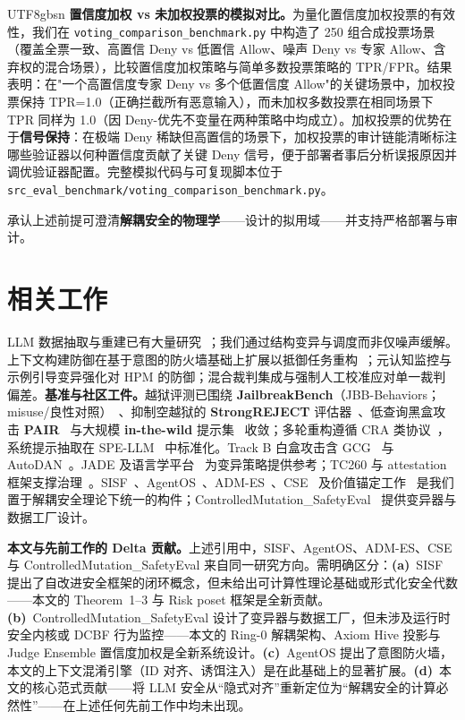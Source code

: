 \documentclass[letterpaper,twocolumn,10pt]{article}
\begin{document}
\begin{CJK}{UTF8}{gbsn}
\textbf{置信度加权 vs 未加权投票的模拟对比。}为量化置信度加权投票的有效性，我们在 \texttt{voting\_comparison\_benchmark.py} 中构造了 250 组合成投票场景（覆盖全票一致、高置信 Deny vs 低置信 Allow、噪声 Deny vs 专家 Allow、含弃权的混合场景），比较置信度加权策略与简单多数投票策略的 TPR/FPR。结果表明：在"一个高置信度专家 Deny vs 多个低置信度 Allow"的关键场景中，加权投票保持 TPR=1.0（正确拦截所有恶意输入），而未加权多数投票在相同场景下 TPR 同样为 1.0（因 Deny-优先不变量在两种策略中均成立）。加权投票的优势在于\textbf{信号保持}：在极端 Deny 稀缺但高置信的场景下，加权投票的审计链能清晰标注哪些验证器以何种置信度贡献了关键 Deny 信号，便于部署者事后分析误报原因并调优验证器配置。完整模拟代码与可复现脚本位于 \texttt{src\_eval\_benchmark/voting\_comparison\_benchmark.py}。

承认上述前提可澄清\textbf{解耦安全的物理学}——设计的拟用域——并支持严格部署与审计。

\section{相关工作}

LLM 数据抽取与重建已有大量研究~\cite{llm-reconstruction-emergent,split-ft-attack,active-reconstruction}；我们通过结构变异与调度而非仅噪声缓解。上下文构建防御在基于意图的防火墙基础上扩展以抵御任务重构~\cite{agentos-arxiv}；元认知监控与示例引导变异强化对 HPM 的防御；混合裁判集成与强制人工校准应对单一裁判偏差。\textbf{基准与社区工件。}越狱评测已围绕 \textbf{JailbreakBench}（JBB-Behaviors；misuse/良性对照）~\cite{jailbreakbench}、抑制空越狱的 \textbf{StrongREJECT} 评估器~\cite{strongreject}、低查询黑盒攻击 \textbf{PAIR}~\cite{pair-jailbreak} 与大规模 \textbf{in-the-wild} 提示集~\cite{wild-jailbreak-prompts} 收敛；多轮重构遵循 CRA 类协议~\cite{cra-reconstruction}，系统提示抽取在 SPE-LLM~\cite{spe-llm} 中标准化。Track B 白盒攻击含 GCG~\cite{gcg} 与 AutoDAN~\cite{autodan}。JADE 及语言学平台~\cite{jade-linguistics,jade-db} 为变异策略提供参考；TC260 与 attestation 框架支撑治理~\cite{tc260-governance,tc260-training-data,dual-use-attestations}。SISF~\cite{sisf-arxiv}、AgentOS~\cite{agentos-arxiv}、ADM-ES~\cite{adm-es-arxiv}、CSE~\cite{cse-arxiv} 及价值锚定工作~\cite{epistemic-grounding,hpm-jailbreak} 是我们置于解耦安全理论下统一的构件；ControlledMutation\_SafetyEval~\cite{ControlledMutation_SafetyEval} 提供变异器与数据工厂设计。

\textbf{本文与先前工作的 Delta 贡献。}上述引用中，SISF、AgentOS、ADM-ES、CSE 与 ControlledMutation\_SafetyEval 来自同一研究方向。需明确区分：\textbf{(a)}~SISF 提出了自改进安全框架的闭环概念，但未给出可计算性理论基础或形式化安全代数——本文的 Theorem~1--3 与 Risk poset 框架是全新贡献。\textbf{(b)}~ControlledMutation\_SafetyEval 设计了变异器与数据工厂，但未涉及运行时安全内核或 DCBF 行为监控——本文的 Ring-0 解耦架构、Axiom Hive 投影与 Judge Ensemble 置信度加权是全新系统设计。\textbf{(c)}~AgentOS 提出了意图防火墙，本文的上下文混淆引擎（ID 对齐、诱饵注入）是在此基础上的显著扩展。\textbf{(d)}~本文的核心范式贡献——将 LLM 安全从``隐式对齐''重新定位为``解耦安全的计算必然性''——在上述任何先前工作中均未出现。


\end{CJK}
\end{document}
